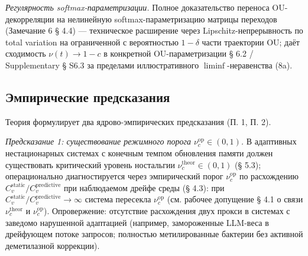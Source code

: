 \documentclass[pdflatex,sn-mathphys-ay]{sn-jnl}
\begin{document}
\emph{Регулярность softmax-параметризации.} Полное доказательство переноса OU-декорреляции на нелинейную softmax-параметризацию матрицы переходов (Замечание 6 § 4.4) --- техническое расширение через Lipschitz-непрерывность по total variation на ограниченной с вероятностью \(1-\delta\) части траектории OU; даёт сходимость \(\nu(t) \to 1 - c\) в конкретной OU-параметризации § 6.2 / Supplementary § S6.3 за пределами иллюстративного \(\liminf\)-неравенства (8a).



\subsection{Эмпирические предсказания}\label{ux44dux43cux43fux438ux440ux438ux447ux435ux441ux43aux438ux435-ux43fux440ux435ux434ux441ux43aux430ux437ux430ux43dux438ux44f}



Теория формулирует два ядрово-эмпирических предсказания (П. 1, П. 2).



\emph{Предсказание 1: существование режимного порога \(\nu_c^{\text{op}} \in (0, 1)\).} В адаптивных нестационарных системах с конечным темпом обновления памяти должен существовать критический уровень ностальгии \(\nu_c^{\text{theor}} \in (0, 1)\) (§ 5.3); операционально диагностируется через эмпирический порог \(\nu_c^{\text{op}}\) по расхождению \(C_v^{\text{static}}/C_v^{\text{predictive}}\) при наблюдаемом дрейфе среды (§ 4.3): при \(C_v^{\text{static}}/C_v^{\text{predictive}} \to \infty\) система пересекла \(\nu_c^{\text{op}}\) (см. рабочее допущение § 4.1 о связи \(\nu_c^{\text{theor}}\) и \(\nu_c^{\text{op}}\)). Опровержение: отсутствие расхождения двух прокси в системах с заведомо нарушенной адаптацией (например, замороженные LLM-веса в дрейфующем потоке запросов; полностью метилированные бактерии без активной деметилазной коррекции).
\end{document}
